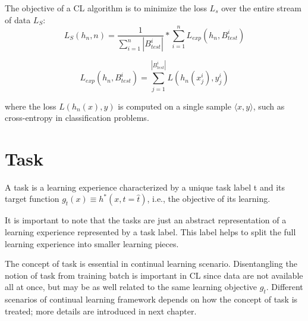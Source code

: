 \documentclass[english, LaM, oneside]{sapthesis}%
\begin{document}
The objective of a CL algorithm is to minimize the loss $L_s$ over the entire stream of data $L_S$:
\begin{equation}
                L_S(h_n,n) = \frac{1}{\sum_{i=1}^{n}{|B_{test}^i|}} * \sum_{i=1}^{n}{L_{exp}(h_n,B_{test}^i)}
\end{equation}

\begin{equation}
                L_{exp}(h_n,B_{test}^i) = \sum_{j=1}^{|B_{test}^i|}{L(h_n(x_j^i),y_j^i)}
\end{equation}

where the loss $L(h_n(x),y)$ is computed on a single sample $\langle x,y \rangle$, such as cross-entropy in classification problems.






\section{Task}
A task is a learning experience characterized by a unique task label t and its target function $g_{\widehat{t}}(x) \equiv h^\ast(x, t = \hat{t})$, i.e., the objective of its learning.

It is important to note that the tasks are just an abstract representation of a learning experience represented by a task label. This label helps to split the full learning experience into smaller learning pieces.

The concept of task is essential in continual learning scenario. Disentangling the notion of task from training batch is important in CL since data are not available all at once, but may be as well related to the same learning objective $g_{\widehat{t}}$.
Different scenarios of continual learning framework depends on how the concept of task is treated; more details are introduced in next chapter.
\end{document}
